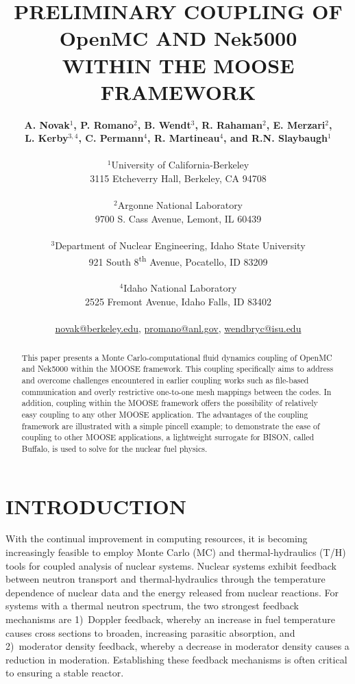 \documentclass[letterpaper]{physor2018}
\title{PRELIMINARY COUPLING OF OpenMC AND Nek5000\\
WITHIN THE MOOSE FRAMEWORK}
\author{%
  \textbf{A. Novak$^{1}$, P. Romano$^2$, B. Wendt$^3$, R. Rahaman$^2$, E. Merzari$^2$,}\\
  \textbf{L. Kerby$^{3,4}$, C. Permann$^4$, R. Martineau$^4$, and R.N. Slaybaugh$^{1}$}\\
  \\
  $^1$University of California-Berkeley\\
  3115 Etcheverry Hall, Berkeley, CA 94708\\
\\
  $^2$Argonne National Laboratory\\ 
    9700 S. Cass Avenue, Lemont, IL 60439\\ 
     \\
 $^3$Department of Nuclear Engineering, Idaho State University \\
      921 South 8\textsuperscript{th} Avenue, Pocatello, ID 83209\\
     \\
  $^4$Idaho National Laboratory\\
  2525 Fremont Avenue, Idaho Falls, ID 83402\\
     \\
  \url{novak@berkeley.edu}, \url{promano@anl.gov}, \url{wendbryc@isu.edu}
}
\begin{document}
\maketitle
\justify

\begin{abstract}
This paper presents a Monte Carlo-computational fluid dynamics coupling of OpenMC
and Nek5000 within the MOOSE framework. This coupling specifically
aims to address and overcome challenges encountered in earlier coupling works
such as file-based communication and overly restrictive one-to-one mesh mappings
between the codes. In addition, coupling within the MOOSE framework offers
the possibility of relatively easy coupling to any other MOOSE application. The
advantages of the coupling framework are illustrated with a simple pincell example;
to demonstrate the ease of coupling to other MOOSE applications,
a lightweight surrogate for BISON, called Buffalo, is used to solve for the nuclear fuel physics.
\end{abstract}

\section{INTRODUCTION}
With the continual improvement in computing resources, it is becoming
increasingly feasible to employ Monte Carlo (MC) and thermal-hydraulics (T/H)
tools for coupled analysis of nuclear systems. Nuclear systems exhibit feedback
between neutron transport and thermal-hydraulics through the
temperature dependence of nuclear data and the energy released from nuclear
reactions. For systems with a thermal neutron spectrum, the two strongest
feedback mechanisms are
  1)~Doppler feedback, whereby an increase in fuel temperature causes cross
  sections to broaden, increasing parasitic absorption,
  and 2)~moderator density feedback, whereby a decrease in moderator density
  causes a reduction in moderation.
Establishing these feedback mechanisms is often
critical to ensuring a stable reactor.
\end{document}
